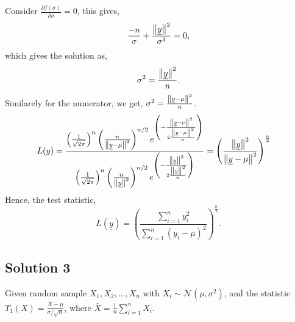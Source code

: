 \documentclass[a4paper,english,12pt]{article}
\begin{document}
\begin{enumerate}[label=(\alph*).]
\begin{equation*}
\end{equation*}
Consider $\frac{\partial f(\sigma)}{\partial \sigma}=0$, this gives,
\begin{equation*}
\frac{-n}{\sigma }+\frac{\left\lVert\underline{y}\right\rVert^2}{\sigma^3}=0,
\end{equation*}
which gives the solution as,
\begin{equation*}
\sigma^2 = \frac{\left\lVert\underline{y}\right\rVert^2}{n}.
\end{equation*}
Similarely for the numerator, we get, $\sigma^2=\frac{\left\lVert\underline{y}-\mu\right\rVert^2}{n}$.
\begin{align*}
L(y)&=\frac{\left(\frac{1}{\sqrt{2\pi}}\right)^n \left(\frac{n}{\left\lVert\underline{y}-\mu\right\rVert^2}\right)^{n/2}e^{\left(-\frac{ \left\lVert\underline{y}-\mu\right\rVert^2}{2 \frac{\left\lVert\underline{y}-\mu\right\rVert^2}{n}} \right)}}{\left(\frac{1}{\sqrt{2\pi}}\right)^n \left(\frac{n}{\left\lVert\underline{y}\right\rVert^2}\right)^{n/2}e^{\left(-\frac{ \left\lVert\underline{y}\right\rVert^2}{2 \frac{\left\lVert\underline{y}\right\rVert^2}{n}} \right)}}=\left(\frac{\left\lVert\underline{y}\right\rVert^2}{\left\lVert\underline{y}-\mu\right\rVert^2}\right)^{\frac{n}{2}}
\end{align*}
Hence, the test statistic,
\begin{equation*}
L(\underline{y})=\left(\frac{\sum \limits_{i=1}^n y_i^2}{\sum \limits_{i=1}^n (y_i - \mu)^2}\right)^{\frac{n}{2}}.
\end{equation*}
\end{enumerate}
\hypertarget{solution3}{\subsection*{Solution 3}}
Given random sample $X_1,X_2,\dots,X_n$ with $X_i\sim \mathcal{N}(\mu,\sigma^2)$, and the statistic $T_1(X)=\frac{\bar{X}-\mu}{\sigma/\sqrt{n}}$, where  $\bar{X}=\frac{1}{n}\sum\limits_{i=1}^{n} X_i$.
\end{document}
